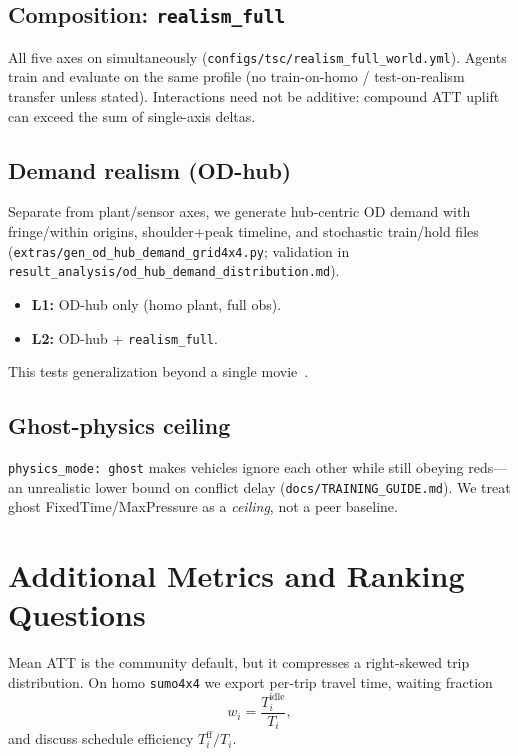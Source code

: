 \documentclass[11pt,a4paper]{article}
\begin{document}
\subsection{Composition: \texttt{realism\_full}}
All five axes on simultaneously (\texttt{configs/tsc/realism\_full\_world.yml}).
Agents train and evaluate on the same profile (no train-on-homo / test-on-realism transfer unless stated).
Interactions need not be additive: compound ATT uplift can exceed the sum of single-axis deltas.

\subsection{Demand realism (OD-hub)}
Separate from plant/sensor axes, we generate hub-centric OD demand with fringe/within origins, shoulder+peak timeline, and stochastic train/hold files (\texttt{extras/gen\_od\_hub\_demand\_grid4x4.py}; validation in \texttt{result\_analysis/od\_hub\_demand\_distribution.md}).
\begin{itemize}
  \item \textbf{L1:} OD-hub only (homo plant, full obs).
  \item \textbf{L2:} OD-hub + \texttt{realism\_full}.
\end{itemize}
This tests generalization beyond a single movie~\citep{ault2021resco}.

\subsection{Ghost-physics ceiling}
\texttt{physics\_mode: ghost} makes vehicles ignore each other while still obeying reds---an unrealistic lower bound on conflict delay (\texttt{docs/TRAINING\_GUIDE.md}).
We treat ghost FixedTime/MaxPressure as a \emph{ceiling}, not a peer baseline.

\section{Additional Metrics and Ranking Questions}
\label{sec:metrics}

Mean ATT is the community default, but it compresses a right-skewed trip distribution.
On homo \texttt{sumo4x4} we export per-trip travel time, waiting fraction
\begin{equation}
  w_i = \frac{T^{\mathrm{idle}}_i}{T_i},
\end{equation}
and discuss schedule efficiency $T^{\mathrm{ff}}_i / T_i$.
\end{document}
